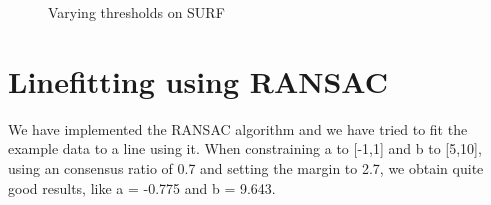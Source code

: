 \documentclass[11pt,a4paper]{article}
\begin{document}
\begin{figure}%
\centering
{}
\quad
{}
\quad
{}
\quad
\caption{Varying thresholds on SURF}%
\label{fig:a23}%
\end{figure}

\FloatBarrier

\section{Linefitting using RANSAC}
We have implemented the RANSAC algorithm and we have tried to fit the example data to a line using it. When constraining a to [-1,1] and b to [5,10], using an consensus ratio of 0.7 and setting the margin to 2.7, we obtain quite good results, like a = -0.775 and b = 9.643.
\end{document}
